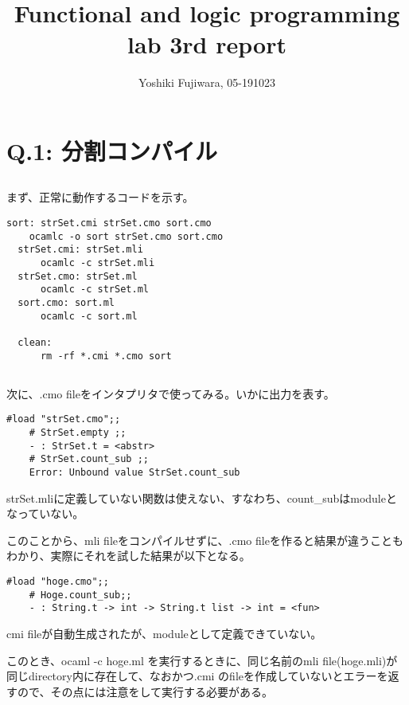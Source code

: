 \documentclass[uplatex,12pt]{jsarticle}
\title {Functional and logic programming lab 3rd report}
\date{}
\begin{document}
\author{Yoshiki Fujiwara, 05-191023}
\maketitle
\section{Q.1: 分割コンパイル}
\subsection{}

まず、正常に動作するコードを示す。
  \begin{lstlisting}[caption=正常に動作するコード]
  sort: strSet.cmi strSet.cmo sort.cmo
    ocamlc -o sort strSet.cmo sort.cmo
  strSet.cmi: strSet.mli
      ocamlc -c strSet.mli
  strSet.cmo: strSet.ml
      ocamlc -c strSet.ml
  sort.cmo: sort.ml
      ocamlc -c sort.ml

  clean:
      rm -rf *.cmi *.cmo sort
  \end{lstlisting}

\subsection{}

次に、.cmo fileをインタプリタで使ってみる。いかに出力を表す。
  \begin{lstlisting}[caption=出力]
    #load "strSet.cmo";;
    # StrSet.empty ;;
    - : StrSet.t = <abstr>
    # StrSet.count_sub ;;
    Error: Unbound value StrSet.count_sub
  \end{lstlisting}
strSet.mliに定義していない関数は使えない、すなわち、count\_subはmoduleとなっていない。

このことから、mli fileをコンパイルせずに、.cmo fileを作ると結果が違うこともわかり、実際にそれを試した結果が以下となる。
  \begin{lstlisting}[caption=出力]
    #load "hoge.cmo";;
    # Hoge.count_sub;;
    - : String.t -> int -> String.t list -> int = <fun>
  \end{lstlisting}
cmi fileが自動生成されたが、moduleとして定義できていない。

このとき、ocaml -c hoge.ml を実行するときに、同じ名前のmli file(hoge.mli)が同じdirectory内に存在して、なおかつ.cmi のfileを作成していないとエラーを返すので、その点には注意をして実行する必要がある。

\subsection{}
\end{document}
